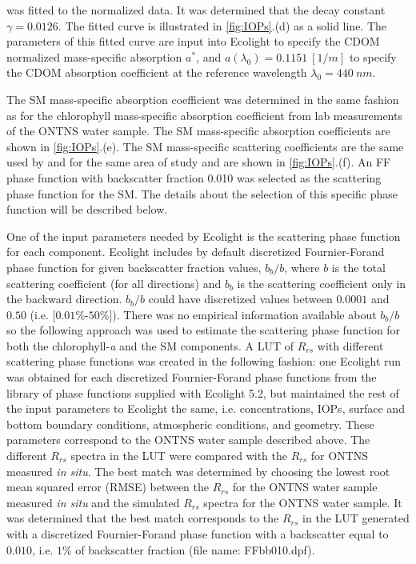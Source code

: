 \documentclass[onecolumn,3p,letterpaper,11pt]{elsarticle}
\begin{document}
\noindent was fitted to the normalized data. It was determined that the decay constant $\gamma=0.0126$. The fitted curve is illustrated in \autoref{fig:IOPs}.(d) as a solid line. The parameters of this fitted curve are input into Ecolight to specify the CDOM normalized mass-specific absorption $a^*$, and $a(\lambda_0)=0.1151~[1/m]$ to specify the CDOM absorption coefficient at the reference wavelength $\lambda_0=440~nm$.

The SM mass-specific absorption coefficient was determined in the same fashion as for the chlorophyll mass-specific absorption coefficient from lab measurements of the ONTNS water sample. The SM mass-specific absorption coefficients are shown in \autoref{fig:IOPs}.(e). The SM mass-specific scattering coefficients are the same used by \citet{Raqueno:2000} and \citet{Raqueno:2003} for the same area of study and are shown in \autoref{fig:IOPs}.(f). An FF phase function with backscatter fraction 0.010 was selected as the scattering phase function for the SM. The details about the selection of this specific phase function will be described below.

One of the input parameters needed by Ecolight is the scattering phase function for each component. Ecolight includes by default discretized Fournier-Forand phase function for given backscatter fraction values, $b_b/b$, where $b$ is the total scattering coefficient (for all directions) and $b_b$ is the scattering coefficient only in the backward direction. $b_b/b$ could have discretized values between $0.0001$ and $0.50$ (i.e. [$0.01\%$-$50\%$]). There was no empirical information available about $b_b/b$ so the following approach was used to estimate the scattering phase function for both the chlorophyll-{\it a} and the SM components. A LUT of $R_{rs}$ with different scattering phase functions was created in the following fashion: one Ecolight run was obtained for each discretized Fournier-Forand phase functions from the library of phase functions supplied with Ecolight 5.2, but maintained the rest of the input parameters to Ecolight the same, i.e. concentrations, IOPs, surface and bottom boundary conditions, atmospheric conditions, and geometry. These parameters correspond to the ONTNS water sample described above. The different $R_{rs}$ spectra in the LUT were compared with the $R_{rs}$ for ONTNS measured {\it in situ}. The best match was determined by choosing the lowest root mean squared error (RMSE) between the $R_{rs}$ for the ONTNS water sample measured {\it in situ} and the simulated $R_{rs}$ spectra for the ONTNS water sample. It was determined that the best match corresponds to the $R_{rs}$ in the LUT generated with a discretized Fournier-Forand phase function with a backscatter equal to $0.010$, i.e. $1\%$ of backscatter fraction (file name: FFbb010.dpf). 
\end{document}
